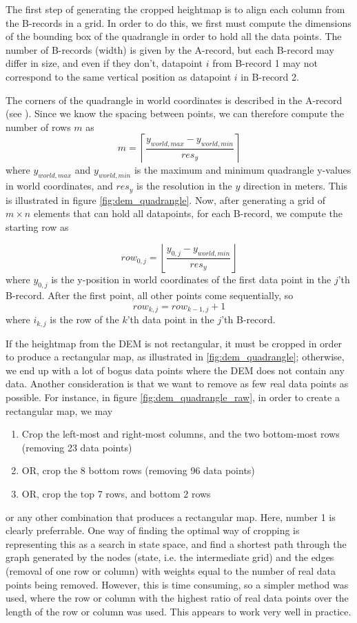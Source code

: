 The first step of generating the cropped heightmap is to align each column from the B-records in a grid. In order to do this, we first must compute the dimensions of the bounding box of the quadrangle in order to hold all the data points. The number of B-records (width) is given by the A-record, but each B-record may differ in size, and even if they don't, datapoint $i$ from B-record 1 may not correspond to the same vertical position as datapoint $i$ in B-record 2. 

The corners of the quadrangle in world coordinates is described in the A-record (see \cite{usgsdem}). Since we know the spacing between points, we can therefore compute the number of rows $m$ as
$$
m = \left\lceil\frac{y_{world,max}-y_{world,min}}{res_y}\right\rceil
$$
where $y_{world,max}$ and $y_{world,min}$ is the maximum and minimum quadrangle y-values in world coordinates, and $res_y$ is the resolution in the $y$ direction in meters. This is illustrated in figure \ref{fig:dem_quadrangle}. Now, after generating a grid of $m\times n$ elements that can hold all datapoints, for each B-record, we compute the starting row as

$$
row_{0,j} = \left\lfloor \frac{y_{0,j}-y_{world,min}}{res_y}\right\rfloor
$$
where $y_{0,j}$ is the y-position in world coordinates of the first data point in the $j$'th B-record. After the first point, all other points come sequentially, so
$$
row_{k,j} = row_{k-1,j} + 1
$$
where $i_{k,j}$ is the row of the $k$'th data point in the $j$'th B-record. 

If the heightmap from the DEM is not rectangular, it must be cropped in order to produce a rectangular map, as illustrated in \ref{fig:dem_quadrangle}; otherwise, we end up with a lot of bogus data points where the DEM does not contain any data. Another consideration is that we want to remove as few {\textit real} data points as possible. For instance, in figure \ref{fig:dem_quadrangle_raw}, in order to create a rectangular map, we may
\begin{enumerate}
\item Crop the left-most and right-most columns, and the two bottom-most rows (removing 23 data points)
\item OR, crop the 8 bottom rows (removing 96 data points)
\item OR, crop the top 7 rows, and bottom 2 rows
\end{enumerate}
or any other combination that produces a rectangular map. Here, number 1 is clearly preferrable. One way of finding the optimal way of cropping is representing this as a search in state space, and find a shortest path through the graph generated by the nodes (state, i.e. the intermediate grid) and the edges (removal of one row or column) with weights equal to the number of real data points being removed. However, this is time consuming, so a simpler method was used, where the row or column with the highest ratio of real data points over the length of the row or column was used. This appears to work very well in practice.

